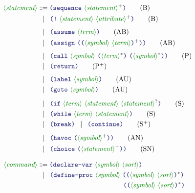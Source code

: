 \documentclass[runningheads]{llncs}
\begin{document}
\begin{align}
\nonterminal{statement}
    & \Coloneqq
        \LP \terminal{sequence}~
            \nonterminal{statement} \rplus
        \RP \tag{B} \\
    & \alt
        \LP \terminal{!}~
            \nonterminal{statement}~
            \nonterminal{attribute}\rplus
        \RP \tag{B} \\[4pt]
    & \alt
        \LP \terminal{assume}~
            \nonterminal{term}
        \RP \tag{AB} \\
    & \alt
        \LP \terminal{assign}~
            \LP \LP \nonterminal{symbol}~\nonterminal{term} \RP\rplus \RP
        \RP \tag{AB} \\[4pt]
    & \alt
        \LP \terminal{call}~\nonterminal{symbol}~
            \LP \nonterminal{term}\rstar \RP~
            \LP \nonterminal{symbol}\rstar \RP
        \RP \tag{P} \\
    & \alt
        \LP \terminal{return} \RP
       \tag{P$^+$} \\[4pt] 
    & \alt
        \LP \terminal{label}~
            \nonterminal{symbol}
        \RP \tag{AU} \\
    & \alt
        \LP \terminal{goto}~
            \nonterminal{symbol}
        \RP \tag{AU} \\[4pt]
    & \alt
        \LP \terminal{if}~
            \nonterminal{term}~
            \nonterminal{statement}~
            \nonterminal{statement}\ropt
        \RP \tag{S} \\
    & \alt
        \LP \terminal{while}~
            \nonterminal{term}~
            \nonterminal{statement}
        \RP \tag{S} \\
    & \alt
        \LP \terminal{break} \RP \alt \LP \terminal{continue} \RP
        \tag{S$^+$} \\[4pt]
    & \alt
        \LP \terminal{havoc}~
            \LP \nonterminal{symbol}\rplus \RP
        \RP \tag{AN} \\
    & \alt
        \LP \terminal{choice}~
            \LP \nonterminal{statement}\rplus \RP
        \RP \tag{SN} \\[8pt]
%
\nonterminal{command}
    & \Coloneqq
        \LP \terminal{declare-var}~
            \nonterminal{symbol}~\nonterminal{sort}
        \RP \notag \\
    & \alt
        \LP \terminal{define-proc}~
            \nonterminal{symbol}~
            \LP \LP \nonterminal{symbol}~\nonterminal{sort}\RP\rstar \RP \notag \\
    & \hspace*{4.42cm} \LP \LP \nonterminal{symbol}~\nonterminal{sort}\RP\rstar \RP \notag \\

\end{align}
\end{document}
